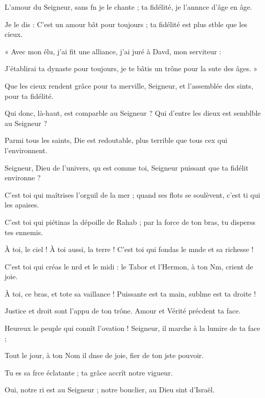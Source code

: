 \item L’amour du Seigneur, sans fn je le chante ;\psstar{} ta fidélité, je l’annnce d’âge en âge.
\item Je le dis : C’est un amour bât pour toujours ;\psstar{} ta fidélité est plus stble que les cieux.
\item « Avec mon élu, j’ai fit une alliance,\psstar{} j’ai juré à Davd, mon serviteur :
\item J’établirai ta dynaste pour toujours,\psstar{} je te bâtis un trône pour la sute des âges. »
\item Que les cieux rendent grâce pour ta merville, Seigneur,\psstar{} et l’assemblée des sints, pour ta fidélité.
\item Qui donc, là-haut, est comparble au Seigneur ?\psstar{} Qui d’entre les dieux est semblble au Seigneur ?
\item Parmi tous les saints, Die est redoutable,\psstar{} plus terrible que tous cex qui l’environnent.
\item Seigneur, Dieu de l’univers, qu est comme toi,\psstar{} Seigneur puissant que ta fidélit environne ?
\item C’est toi qui maîtrises l’orguil de la mer ;\psstar{} quand ses flots se soulèvent, c’est ti qui les apaises.
\item C’est toi qui piétinas la dépoille de Rahab ;\psstar{} par la force de ton bras, tu disperss tes ennemis.
\item À toi, le ciel ! À toi aussi, la terre !\psstar{} C’est toi qui fondas le mnde et sa richesse !
\item C’est toi qui créas le nrd et le midi :\psstar{} le Tabor et l’Hermon, à ton Nm, crient de joie.
\item À toi, ce bras, et tote sa vaillance !\psstar{} Puissante est ta main, sublme est ta droite !
\item Justice et droit sont l’appu de ton trône.\psstar{} Amour et Vérité précdent ta face.
\item Heureux le peuple qui connît l’ovation !\psstar{} Seigneur, il marche à la lumire de ta face ;
\item Tout le jour, à ton Nom il dnse de joie,\psstar{} fier de ton jste pouvoir.
\item Tu es sa frce éclatante ;\psstar{} ta grâce accrît notre vigueur.
\item Oui, notre ri est au Seigneur ;\psstar{} notre bouclier, au Dieu sint d’Israël.